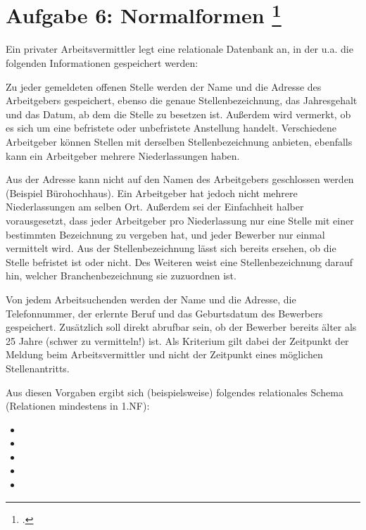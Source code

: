 \documentclass{lehramt-informatik-aufgabe}
\begin{document}
\let\m=\liMenge
\let\fa=\liFunktionaleAbhaengigkeit


\section{Aufgabe 6: Normalformen
\footcite{db:ab:7}}

Ein privater Arbeitsvermittler legt eine relationale Datenbank an, in
der u.a. die folgenden Informationen gespeichert werden:

Zu jeder gemeldeten offenen Stelle werden der Name und die Adresse des
Arbeitgebers gespeichert, ebenso die genaue Stellenbezeichnung, das
Jahresgehalt und das Datum, ab dem die Stelle zu besetzen ist. Außerdem
wird vermerkt, ob es sich um eine befristete oder unbefristete
Anstellung handelt. Verschiedene Arbeitgeber können Stellen mit
derselben Stellenbezeichnung anbieten, ebenfalls kann ein Arbeitgeber
mehrere Niederlassungen haben.

Aus der Adresse kann nicht auf den Namen des Arbeitgebers geschlossen
werden (Beispiel Bürohochhaus). Ein Arbeitgeber hat jedoch nicht mehrere
Niederlassungen am selben Ort. Außerdem sei der Einfachheit halber
vorausgesetzt, dass jeder Arbeitgeber pro Niederlassung nur eine Stelle
mit einer bestimmten Bezeichnung zu vergeben hat, und jeder Bewerber nur
einmal vermittelt wird. Aus der Stellenbezeichnung lässt sich bereits
ersehen, ob die Stelle befristet ist oder nicht. Des Weiteren weist eine
Stellenbezeichnung darauf hin, welcher Branchenbezeichnung sie
zuzuordnen ist.

Von jedem Arbeitsuchenden werden der Name und die Adresse, die
Telefonnummer, der erlernte Beruf und das Geburtsdatum des Bewerbers
gespeichert. Zusätzlich soll direkt abrufbar sein, ob der Bewerber
bereits älter als 25 Jahre (schwer zu vermitteln!) ist. Als Kriterium
gilt dabei der Zeitpunkt der Meldung beim Arbeitsvermittler und nicht
der Zeitpunkt eines möglichen Stellenantritts.

Aus diesen Vorgaben ergibt sich (beispielsweise) folgendes relationales
Schema (Relationen mindestens in 1.NF):

\begin{itemize}
\item {}

\item {}

\item {}

\item {}

\item {}
\end{itemize}
\end{document}
